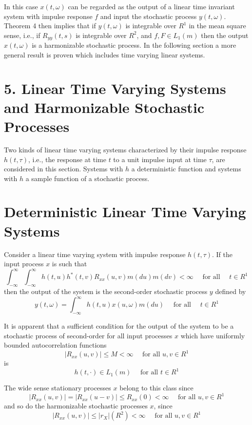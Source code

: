 \documentclass{article}
\begin{document}
In this case $x(t, \omega)$ can be regarded as the output of a linear time invariant system with impulse response $f$ and input the stochastic process $y(t, \omega)$. Theorem 4 then implies that if $y(t, \omega)$ is integrable over $R^{1}$ in the mean square sense, i.e., if $R_{y y}(t, s)$ is integrable over $R^{2}$, and $f, F \in L_{1}(m)$ then the output $x(t, \omega)$ is a harmonizable stochastic process. In the following section a more general result is proven which includes time varying linear systems.

\section*{5. Linear Time Varying Systems and Harmonizable Stochastic Processes}

Two kinds of linear time varying systems characterized by their impulse response $h(t, \tau)$, i.e., the response at time $t$ to a unit impulse input at time $\tau$, are considered in this section. Systems with $h$ a deterministic function and systems with $h$ a sample function of a stochastic process.

\section*{Deterministic Linear Time Varying Systems}

Consider a linear time varying system with impulse response $h(t, \tau)$. If the input process $x$ is such that
\[
\int_{-\infty}^{\infty} \int_{-\infty}^{\infty} h(t, u) h^{*}(t, v) R_{x x}(u, v) m(d u) m(d v)<\infty \quad \text{ for all } \quad t \in R^{1}
\]
then the output of the system is the second-order stochastic process $y$ defined by
\[
y(t, \omega)=\int_{-\infty}^{\infty} h(t, u) x(u, \omega) m(d u) \quad \text{ for all } \quad t \in R^{1}
\]

It is apparent that a sufficient condition for the output of the system to be a stochastic process of second-order for all input processes $x$ which have uniformly bounded autocorrelation functions
\[
|R_{x x}(u, v)| \leqslant M<\infty \quad \text{ for all } u, v \in R^{1}
\]
is
\[
h(t, \cdot) \in L_{1}(m) \quad \text{ for all } t \in R^{1}
\]

The wide sense stationary processes $x$ belong to this class since
\[
|R_{x x}(u, v)|=|R_{x x}(u-v)| \leqslant R_{x x}(0)<\infty \quad \text{ for all } u, v \in R^{1}
\]
and so do the harmonizable stochastic processes $x$, since
\[
|R_{x x}(u, v)| \leqslant |r_{X}|(R^{2})<\infty \quad \text{ for all } u, v \in R^{1}
\]
\end{document}
